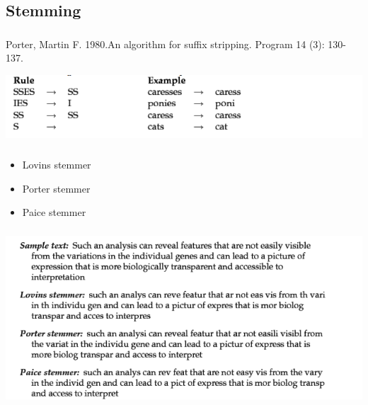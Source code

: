 \documentclass[t, 11pt]{beamer}
\begin{document}
	
	\subsection{Stemming}
	
	\begin{frame}\label{}
		\frametitle{\insertsection}
		\frametitle{\insertsubsection}
		Porter, Martin F. 1980.An algorithm for suffix stripping. Program 14 (3): 130-137.  
	
	\vspace{1cm}
	\includegraphics[width=\linewidth]{stem.png}
	\end{frame}
	
	\begin{frame}\label{}
	\frametitle{\insertsection}
	\frametitle{\insertsubsection}
\begin{itemize}
	\item Lovins stemmer
	\item Porter stemmer
	\item Paice stemmer
\end{itemize}
\end{frame}
	
	
	\begin{frame}\label{}
	\frametitle{\insertsection}
	\frametitle{\insertsubsection}
 
	
	\includegraphics[width=\linewidth]{troi.png}
\end{frame}
\end{document}
